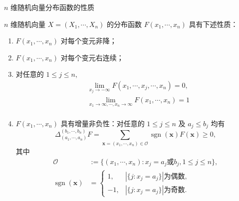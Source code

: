 \begin{frame}{$n$ 维随机向量分布函数的性质}
	\vspace{-0.15cm}
	\begin{thm}
	 	$n$ 维随机向量 $X=\left (X_1,\cdots ,X_n \right)$ 的分布函数 $F\left ( x_1,\cdots ,x_n \right)$ 具有下述性质：
		\begin{enumerate}[<+-|alert@+>]
			\item $F\left (x_1,\cdots ,x_n \right)$ 对每个变元非降；
			\item $F\left (x_1,\cdots ,x_n \right)$ 对每个变元右连续；
			\item 对任意的 $1\leq j\leq n$, $$
			\begin{aligned}
				&\lim_{x_j\rightarrow -\infty} F\left( x_1,\cdots, x_j,\cdots,x_n \right) =0,\\
				&\lim_{x_1\rightarrow \infty ,\cdots ,x_n\rightarrow \infty} F\left( x_1,\cdots ,x_n \right) =1\\
			\end{aligned}
			$$
			\item $F\left (x_1,\cdots ,x_n\right)$ 具有增量非负性：对任意的 $1\leq j\leq n$ 及 $a_j\leqslant b_j$ 均有 %
			$$
			\Delta_{\left(a_{1}, \cdots, a_{n}\right)}^{\left(b_{1}, \cdots, b_{n}\right)} F=\sum_{\boldsymbol{x}=(x_1,\cdots, x_n)\in\mathcal{O}} \operatorname{sgn}(\boldsymbol{x}) F(\boldsymbol{x}) \geqslant 0,
			$$
			其中 \vspace{-0.5cm}
			\begin{align*}
				\mathcal{O}&:=\{(x_1,\cdots,x_n): x_j=a_j\mbox{或} b_j, 1\leq j\leq n\},\\
				\operatorname{sgn}(\boldsymbol{x})&=\left\{
				\begin{array}{ll}
					1,& |\{j:x_j=a_j\}|\mbox{为偶数},\\
					-1, &|\{j:x_j=a_j\}|\mbox{为奇数}.
					\end{array}\right.
			\end{align*}
		\end{enumerate}
	\end{thm}

\end{frame}
